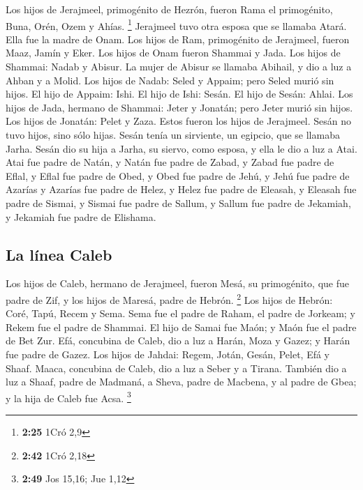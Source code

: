 \begin{paracol}{2}
 Los hijos de Jerajmeel, primogénito de Hezrón, fueron
Rama el primogénito, Buna, Orén, Ozem y Ahías. \footnote{\textbf{2:25}
  1Cró 2,9}  Jerajmeel tuvo otra esposa que se llamaba
Atará. Ella fue la madre de Onam.  Los hijos de Ram,
primogénito de Jerajmeel, fueron Maaz, Jamín y Eker.  Los
hijos de Onam fueron Shammai y Jada. Los hijos de Shammai: Nadab y
Abisur.  La mujer de Abisur se llamaba Abihail, y dio a
luz a Ahban y a Molid.  Los hijos de Nadab: Seled y
Appaim; pero Seled murió sin hijos.  El hijo de Appaim:
Ishi. El hijo de Ishi: Sesán. El hijo de Sesán: Ahlai. 
Los hijos de Jada, hermano de Shammai: Jeter y Jonatán; pero Jeter murió
sin hijos.  Los hijos de Jonatán: Pelet y Zaza. Estos
fueron los hijos de Jerajmeel.  Sesán no tuvo hijos, sino
sólo hijas. Sesán tenía un sirviente, un egipcio, que se llamaba Jarha.
 Sesán dio su hija a Jarha, su siervo, como esposa, y
ella le dio a luz a Atai.  Atai fue padre de Natán, y
Natán fue padre de Zabad,  y Zabad fue padre de Eflal, y
Eflal fue padre de Obed,  y Obed fue padre de Jehú, y
Jehú fue padre de Azarías  y Azarías fue padre de Helez,
y Helez fue padre de Eleasah,  y Eleasah fue padre de
Sismai, y Sismai fue padre de Sallum,  y Sallum fue padre
de Jekamiah, y Jekamiah fue padre de Elishama.

\hypertarget{la-luxednea-caleb-1}{%
\subsection{La línea Caleb}\label{la-luxednea-caleb-1}}

 Los hijos de Caleb, hermano de Jerajmeel, fueron Mesá,
su primogénito, que fue padre de Zif, y los hijos de Maresá, padre de
Hebrón. \footnote{\textbf{2:42} 1Cró 2,18}  Los hijos de
Hebrón: Coré, Tapú, Recem y Sema.  Sema fue el padre de
Raham, el padre de Jorkeam; y Rekem fue el padre de Shammai.
 El hijo de Samai fue Maón; y Maón fue el padre de Bet
Zur.  Efá, concubina de Caleb, dio a luz a Harán, Moza y
Gazez; y Harán fue padre de Gazez.  Los hijos de Jahdai:
Regem, Jotán, Gesán, Pelet, Efá y Shaaf.  Maaca,
concubina de Caleb, dio a luz a Seber y a Tirana. 
También dio a luz a Shaaf, padre de Madmaná, a Sheva, padre de Macbena,
y al padre de Gbea; y la hija de Caleb fue Acsa. \footnote{\textbf{2:49}
  Jos 15,16; Jue 1,12}


\end{paracol}

